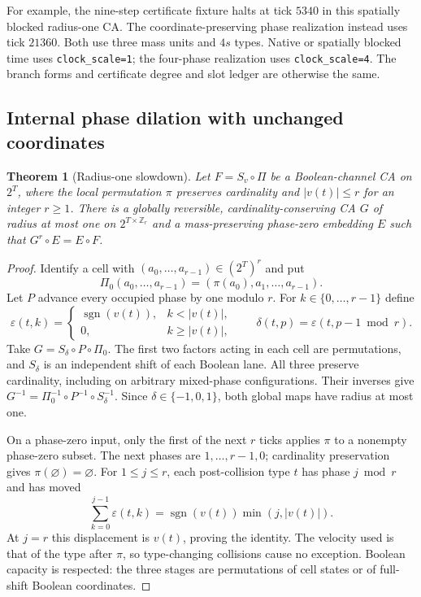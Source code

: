 \documentclass[11pt,letterpaper]{article}
\numberwithin{equation}{section}
\newtheorem{theorem}{Theorem}[section]
\theoremstyle{definition}
\theoremstyle{remark}
\begin{document}
For example, the nine-step certificate fixture halts at tick $5340$
in this spatially blocked radius-one CA. The coordinate-preserving
phase realization instead uses tick $21360$. Both use three mass units
and $4s$ types. Native or spatially blocked time uses
\texttt{clock\_scale=1}; the four-phase realization uses
\texttt{clock\_scale=4}. The branch forms and certificate degree and
slot ledger are otherwise the same.

\subsection{Internal phase dilation with unchanged coordinates}\label{smc:tm:sec:phase}

\begin{theorem}[Radius-one slowdown]\label{smc:tm:thm:slowdown}
Let $F=S_v\circ\Pi$ be a Boolean-channel CA on $2^T$, where the local
permutation $\pi$ preserves cardinality and $|v(t)|\le r$ for an integer
$r\ge1$. There is a globally reversible, cardinality-conserving CA $G$ of
radius at most one on $2^{T\times\mathbb Z_r}$ and a mass-preserving
phase-zero embedding $E$ such that $G^r\circ E=E\circ F$.
\end{theorem}
\begin{proof}
Identify a cell with $(a_0,\ldots,a_{r-1})\in(2^T)^r$ and put
\[
 \Pi_0(a_0,\ldots,a_{r-1})=(\pi(a_0),a_1,\ldots,a_{r-1}).
\]
Let $P$ advance every occupied phase by one modulo $r$. For
$k\in\{0,\ldots,r-1\}$ define
\[
 \varepsilon(t,k)=
 \begin{cases}\operatorname{sgn}(v(t)),&k<|v(t)|,\\0,&k\ge|v(t)|,\end{cases}
 \qquad
 \delta(t,p)=\varepsilon(t,p-1\bmod r).
\]
Take $G=S_\delta\circ P\circ\Pi_0$. The first two factors acting in each
cell are permutations, and $S_\delta$ is an independent shift of each
Boolean lane. All three preserve cardinality, including on arbitrary
mixed-phase configurations. Their inverses give
$G^{-1}=\Pi_0^{-1}\circ P^{-1}\circ S_\delta^{-1}$. Since
$\delta\in\{-1,0,1\}$, both global maps have radius at most one.

On a phase-zero input, only the first of the next $r$ ticks applies
$\pi$ to a nonempty phase-zero subset. The next phases are
$1,\ldots,r-1,0$; cardinality preservation gives $\pi(\varnothing)=\varnothing$.
For $1\le j\le r$, each post-collision type $t$ has phase $j\bmod r$
and has moved
\[
 \sum_{k=0}^{j-1}\varepsilon(t,k)
   =\operatorname{sgn}(v(t))\min(j,|v(t)|).
\]
At $j=r$ this displacement is $v(t)$, proving the identity. The velocity
used is that of the type after $\pi$, so type-changing collisions cause
no exception. Boolean capacity is respected: the three stages are
permutations of cell states or of full-shift Boolean coordinates.
\end{proof}
\end{document}
